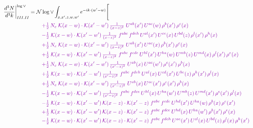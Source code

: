 \documentclass[10pt]{article}
\numberwithin{equation}{section}
\newcommand{\NNv}{\mathcal N\log\vee}
\begin{document}
\begin{align}
\frac{d^3N}{d^3k}\bigg|^{\log\vee}_{III.II}={}&\NNv\int_{x,x',z,w,w'}e^{-ik\cdot(w'-w)}\Bigg[\notag\\
&\quad{\color{CC}+\tfrac{1}{2}\,N_c\;\mathcal{K}(x-w)\cdot\mathcal{K}(x'-w')\,\tfrac{1}{(x-z)^{2}}\;U^{ab}(x')\,U^{ac}(w)\,\rho^{b}(x')\,\rho^{c}(x)}\notag\\
&\quad{\color{CC}-\tfrac{1}{2}\;\mathcal{K}(x-w)\cdot\mathcal{K}(x'-w')\,\tfrac{1}{(x-z)^{2}}\;f^{abc}\,f^{deh}\,U^{al}(x')\,U^{ce}(x)\,U^{bd}(z)\,\rho^{l}(x')\,\rho^{h}(x)}\notag\\
&\quad{\color{CC}+\tfrac{1}{2}\,N_c\;\mathcal{K}(x-w)\cdot\mathcal{K}(x'-w')\,\tfrac{1}{(x-z)^{2}}\;U^{ab}(x')\,U^{ac}(x)\,\rho^{b}(x')\,\rho^{c}(x)}\notag\\
&\quad{\color{CC}+\tfrac{1}{2}\;\mathcal{K}(x-w)\cdot\mathcal{K}(x'-w')\,\tfrac{1}{(x-z)^{2}}\;f^{abc}\,f^{cde}\,U^{hl}(x')\,U^{ha}(w)\,U^{mb}(z)\,U^{md}(x)\,\rho^{l}(x')\,\rho^{e}(x)}\notag\\
&\quad{\color{CC}+\tfrac{1}{2}\,N_c\;\mathcal{K}(x-w)\cdot\mathcal{K}(x'-w')\,\tfrac{1}{(x'-z)^{2}}\;U^{ab}(x)\,U^{ac}(w')\,\rho^{c}(x')\,\rho^{b}(x)}\notag\\
&\quad{\color{CC}+\tfrac{1}{2}\;\mathcal{K}(x-w)\cdot\mathcal{K}(x'-w')\,\tfrac{1}{(x'-z)^{2}}\;f^{abc}\,f^{deh}\,U^{al}(x)\,U^{cd}(x')\,U^{be}(z)\,\rho^{h}(x')\,\rho^{l}(x)}\notag\\
&\quad{\color{CC}+\tfrac{1}{2}\,N_c\;\mathcal{K}(x-w)\cdot\mathcal{K}(x'-w')\,\tfrac{1}{(x'-z)^{2}}\;U^{ab}(x)\,U^{ac}(x')\,\rho^{c}(x')\,\rho^{b}(x)}\notag\\
&\quad{\color{CC}-\tfrac{1}{2}\;\mathcal{K}(x-w)\cdot\mathcal{K}(x'-w')\,\tfrac{1}{(x'-z)^{2}}\;f^{abc}\,f^{dce}\,U^{hl}(x)\,U^{ha}(w')\,U^{mb}(z)\,U^{md}(x')\,\rho^{e}(x')\,\rho^{l}(x)}\notag\\
&\quad{\color{CC}-\tfrac{1}{2}\;\mathcal{K}(x-w)\cdot\mathcal{K}(x'-w')\,\mathcal{K}(x-z)\cdot\mathcal{K}(x'-z)\;f^{abc}\,f^{cde}\,U^{hd}(x')\,U^{ha}(w)\,\rho^{b}(x)\,\rho^{e}(x')}\notag\\
&\quad{\color{CC}+\tfrac{1}{2}\;\mathcal{K}(x-w)\cdot\mathcal{K}(x'-w')\,\mathcal{K}(x-z)\cdot\mathcal{K}(x'-z)\;f^{abc}\,f^{dce}\,U^{hd}(x)\,U^{ha}(w')\,\rho^{b}(x')\,\rho^{e}(x)}\notag\\
&\quad{\color{CC}-\tfrac{1}{2}\;\mathcal{K}(x-w)\cdot\mathcal{K}(x'-w')\,\mathcal{K}(x-z)\cdot\mathcal{K}(x'-z)\;f^{abc}\,f^{deh}\,U^{ae}(x')\,U^{cl}(x)\,U^{bd}(z)\,\rho^{l}(x)\,\rho^{h}(x')}\notag\\

\end{align}
\end{document}
